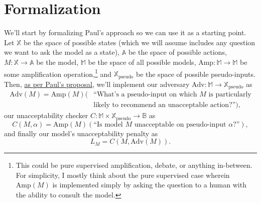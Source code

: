 \documentclass{amsart}
\begin{document}
\section{Formalization}

We'll start by formalizing Paul's approach so we can use it as a starting point. Let $\mathbb X$ be the space of possible states (which we will assume includes any question we want to ask the model as a state), $\mathbb A$ be the space of possible actions, $M: \mathbb X \to \mathbb A$ be the model, $\mathbb M$ be the space of all possible models, $\text{Amp}: \mathbb M \to \mathbb M$ be some amplification operation,\footnote{This could be pure supervised amplification, debate, or anything in-between. For simplicity, I mostly think about the pure supervised case wherein $\text{Amp}(M)$ is implemented simply by asking the question to a human with the ability to consult the model.} and $\mathbb X_\text{pseudo}$ be the space of possible pseudo-inputs. Then, \href{https://ai-alignment.com/training-robust-corrigibility-ce0e0a3b9b4d}{as per Paul's proposal}, we'll implement 
our adversary $\text{Adv}: \mathbb M \to \mathbb X_\text{pseudo}$ as
\begin{align*}
    \text{Adv}(M) = \text{Amp}(M)(&\text{``What's a pseudo-input on which } M \text{ is particularly} \\
    & \text{likely to recommend an unacceptable action?''}),
\end{align*}
our unacceptability checker $C: \mathbb M \times \mathbb X_\text{pseudo} \to \mathbb B$ as
\[
	C(M, \alpha) = \text{Amp}(M)(\text{``Is model } M \text{ unacceptable on pseudo-input } \alpha \text{?''}),
\]
and finally our model's unacceptability penalty as
\[
    L_M = C(M, \text{Adv}(M)).
\]
\end{document}
